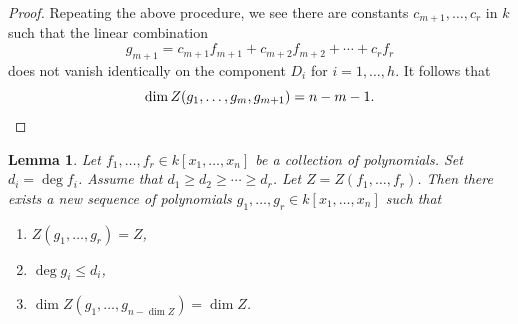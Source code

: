 \documentclass{amsart}
\numberwithin{equation}{section}
\theoremstyle{plain}
\newtheorem{lemma}[equation]{Lemma}
\theoremstyle{definition}
\begin{document}
\begin{proof}
  Repeating the above procedure, we see
  there are constants \(c_{m+1},\ldots, c_r\) in \(k\) such
  that the linear combination
  \[
    g_{m+1} = c_{m+1}f_{m+1}+ c_{m+2}f_{m+2}+ \cdots + c_r f_r
  \]
  does not vanish identically on the component \(D_i\) for \(i=1,\ldots, h\). It
  follows that
  \[
  \dim Z(g_1,\ldots,g_m,g_{m+1}) = n-m-1.\qedhere
  \]
\end{proof}

\begin{lemma}%
  \label{lemma:new-sequence}
  Let \(f_1,\ldots, f_r \in k[x_1,\ldots,x_n]\) be a collection of polynomials.
  Set \(d_i = \deg f_i\). Assume that \(d_1 \geq d_2\geq \cdots \geq d_r\).
  Let \(Z = Z(f_1,\ldots,f_r)\).
  Then there exists a new sequence of polynomials
  \(g_1,\ldots,g_r \in k[x_1,\ldots,x_n]\) such that
  \begin{enumerate}
  \item \(Z(g_1,\ldots,g_r) = Z\),
  \item \(\deg g_i \leq d_i\),
  \item \(\dim Z(g_1,\ldots,g_{n-\dim Z}) = \dim Z\).
  \end{enumerate}
\end{lemma}
\end{document}
